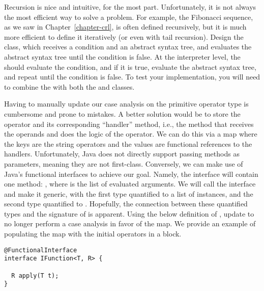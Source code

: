  Recursion is nice and intuitive, for the most part. Unfortunately, it is not always the most efficient way to solve a problem. For example, the Fibonacci sequence, as we saw in Chapter~\ref{chapter-crl}, is often defined recursively, but it is much more efficient to define it iteratively (or even with tail recursion). Design the  class, which receives a condition and an abstract syntax tree, and evaluates the abstract syntax tree until the condition is false. At the interpreter level, the  should evaluate the condition, and if it is true, evaluate the abstract syntax tree, and repeat until the condition is false. To test your implementation, you will need to combine the  with both the  and  classes.

 Having to manually update our case analysis on the primitive operator type is cumbersome and prone to mistakes. A better solution would be to store the operator and its corresponding ``handler'' method, i.e., the method that receives the operands and does the logic of the operator. We can do this via a map where the keys are the string operators and the values are functional references to the handlers. Unfortunately, Java does not directly support passing methods as parameters, meaning they are not first-class. Conversely, we can make use of Java's functional interfaces to achieve our goal. Namely, the interface will contain one method: , where  is the list of evaluated arguments. We will call the interface  and make it generic, with the first type quantified to a list of  instances, and the second type quantified to . Hopefully, the connection between these quantified types and the signature of  is apparent. Using the below definition of , update  to no longer perform a case analysis in favor of the map. We provide an example of populating the map with the initial operators in a  block.

\begin{lstlisting}[language=MyJava]
@FunctionalInterface
interface IFunction<T, R> {
  
  R apply(T t);
}
\end{lstlisting}


